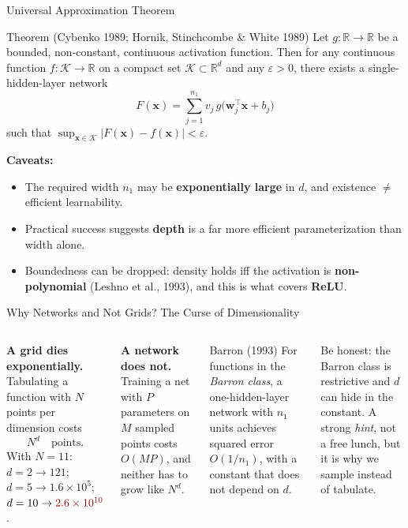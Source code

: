 \documentclass[aspectratio=169,11pt]{beamer}
\newcommand{\emphc}[1]{\textcolor{harvardcrimson}{#1}}
\newcommand{\x}{\bm{x}}
\newcommand{\w}{\bm{w}}
\newcommand{\R}{\mathbb{R}}
\begin{document}
\begin{frame}{Universal Approximation Theorem}
\small
\begin{block}{Theorem (Cybenko 1989; Hornik, Stinchcombe \& White 1989)}
Let $g:\R\to\R$ be a bounded, non-constant, continuous activation function.  Then for any continuous function $f:\mathcal{K}\to\R$ on a compact set $\mathcal{K}\subset\R^d$ and any $\varepsilon>0$, there exists a single-hidden-layer network
\[
    F(\x) = \sum_{j=1}^{n_1} v_j\, g\!\big(\w_j^\top\x + b_j\big)
\]
such that $\sup_{\x\in\mathcal{K}} |F(\x) - f(\x)| < \varepsilon$.
\end{block}
\vspace{-0.15cm}

\vspace{0.1cm}
\textbf{Caveats:}
\begin{itemize}\itemsep0pt
    \item The required width $n_1$ may be \textbf{exponentially large} in $d$, and existence $\neq$ efficient learnability.
    \item Practical success suggests \textbf{depth} is a far more efficient parameterization than width alone.
    \item \emphc{Boundedness can be dropped:} density holds iff the activation is \textbf{non-polynomial} (Leshno et al., 1993), and this is what covers \textbf{ReLU}.
\end{itemize}
\end{frame}

\begin{frame}{Why Networks and Not Grids? The Curse of Dimensionality}
\begin{columns}[T]
\textbf{A grid dies exponentially.}  Tabulating a function with $N$ points per dimension costs
\[
    N^{d} \quad\text{points.}
\]
{\small With $N=11$: $d=2 \to 121$; $d=5 \to 1.6\times10^5$; $d=10 \to \emphc{2.6\times10^{10}}$.}

\vspace{0.25cm}
\textbf{A network does not.}  Training a net with $P$ parameters on $M$ sampled points costs $O(MP)$, and neither has to grow like $N^d$.

\begin{block}{Barron (1993)}
\small For functions in the \emph{Barron class}, a one-hidden-layer network with $n_1$ units achieves squared error $O(1/n_1)$, with a constant that does \emphc{not} depend on $d$.
\end{block}

\vspace{0.2cm}
{\footnotesize \emphc{Be honest:} the Barron class is restrictive and $d$ can hide in the constant.  A strong \emph{hint}, not a free lunch, but it is why we sample instead of tabulate.}
\end{columns}

\end{frame}
\end{document}
